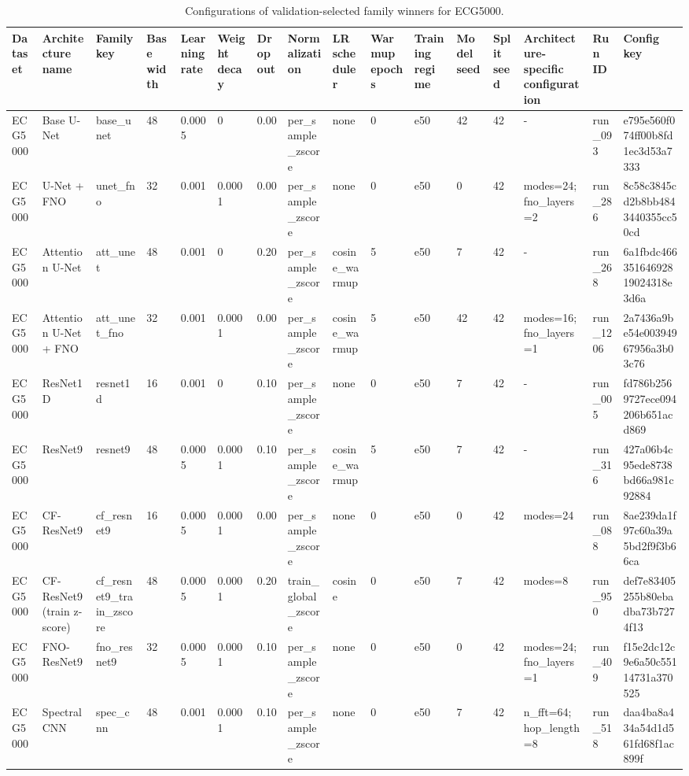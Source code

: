 \begin{table}
\caption{Configurations of validation-selected family winners for ECG5000.}
\label{tab:ecg5000_best_model_configurations}
\begin{tabular}{llllllllllllllll}
\toprule
Dataset & Architecture name & Family key & Base width & Learning rate & Weight decay & Dropout & Normalization & LR scheduler & Warmup epochs & Training regime & Model seed & Split seed & Architecture-specific configuration & Run ID & Config key \\
\midrule
ECG5000 & Base U-Net & base\_unet & 48 & 0.0005 & 0 & 0.00 & per\_sample\_zscore & none & 0 & e50 & 42 & 42 & - & run\_093 & e795e560f074ff00b8fd1ec3d53a7333 \\
ECG5000 & U-Net + FNO & unet\_fno & 32 & 0.001 & 0.0001 & 0.00 & per\_sample\_zscore & none & 0 & e50 & 0 & 42 & modes=24; fno\_layers=2 & run\_286 & 8c58c3845cd2b8bb4843440355cc50cd \\
ECG5000 & Attention U-Net & att\_unet & 48 & 0.001 & 0 & 0.20 & per\_sample\_zscore & cosine\_warmup & 5 & e50 & 7 & 42 & - & run\_268 & 6a1fbdc46635164692819024318e3d6a \\
ECG5000 & Attention U-Net + FNO & att\_unet\_fno & 32 & 0.001 & 0.0001 & 0.00 & per\_sample\_zscore & cosine\_warmup & 5 & e50 & 42 & 42 & modes=16; fno\_layers=1 & run\_1206 & 2a7436a9be54e00394967956a3b03c76 \\
ECG5000 & ResNet1D & resnet1d & 16 & 0.001 & 0 & 0.10 & per\_sample\_zscore & none & 0 & e50 & 7 & 42 & - & run\_005 & fd786b2569727ece094206b651acd869 \\
ECG5000 & ResNet9 & resnet9 & 48 & 0.0005 & 0.0001 & 0.10 & per\_sample\_zscore & cosine\_warmup & 5 & e50 & 7 & 42 & - & run\_316 & 427a06b4c95ede8738bd66a981c92884 \\
ECG5000 & CF-ResNet9 & cf\_resnet9 & 16 & 0.0005 & 0.0001 & 0.00 & per\_sample\_zscore & none & 0 & e50 & 0 & 42 & modes=24 & run\_088 & 8ae239da1f97c60a39a5bd2f9f3b66ca \\
ECG5000 & CF-ResNet9 (train z-score) & cf\_resnet9\_train\_zscore & 48 & 0.0005 & 0.0001 & 0.20 & train\_global\_zscore & cosine & 0 & e50 & 7 & 42 & modes=8 & run\_950 & def7e83405255b80ebadba73b7274f13 \\
ECG5000 & FNO-ResNet9 & fno\_resnet9 & 32 & 0.0005 & 0.0001 & 0.10 & per\_sample\_zscore & none & 0 & e50 & 0 & 42 & modes=24; fno\_layers=1 & run\_409 & f15e2dc12c9e6a50c55114731a370525 \\
ECG5000 & Spectral CNN & spec\_cnn & 48 & 0.001 & 0.0001 & 0.10 & per\_sample\_zscore & none & 0 & e50 & 7 & 42 & n\_fft=64; hop\_length=8 & run\_518 & daa4ba8a434a54d1d561fd68f1ac899f \\

\end{tabular}
\end{table}
